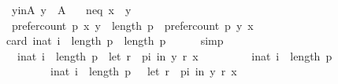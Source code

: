 \begin{isabellebody}
\ \ \ y{\isacharunderscore}{\kern0pt}in{\isacharunderscore}{\kern0pt}A{\isacharcolon}{\kern0pt}\ {\isachardoublequoteopen}y\ {\isasymin}\ A{\isachardoublequoteclose}\isanewline
\ \ \ neq{\isacharcolon}{\kern0pt}\ {\isachardoublequoteopen}x\ {\isasymnoteq}\ y{\isachardoublequoteclose}\isanewline
\ \ \ {\isachardoublequoteopen}prefer{\isacharunderscore}{\kern0pt}count\ p\ x\ y\ {\isacharequal}{\kern0pt}\ {\isacharparenleft}{\kern0pt}length\ p{\isacharparenright}{\kern0pt}\ {\isacharminus}{\kern0pt}\ {\isacharparenleft}{\kern0pt}prefer{\isacharunderscore}{\kern0pt}count\ p\ y\ x{\isacharparenright}{\kern0pt}{\isachardoublequoteclose}\isanewline
%
\isadelimproof
%
\endisadelimproof
%
\isatagproof
{}\isamarkupfalse%
\ {\isacharminus}{\kern0pt}\isanewline
\ \ \isamarkupfalse%
\ {}{}{\isacharcolon}{\kern0pt}\ {\isachardoublequoteopen}card\ {\isacharbraceleft}{\kern0pt}i{\isacharcolon}{\kern0pt}{\isacharcolon}{\kern0pt}nat{\isachardot}{\kern0pt}\ i\ {\isacharless}{\kern0pt}\ length\ p{\isacharbraceright}{\kern0pt}\ {\isacharequal}{\kern0pt}\ length\ p{\isachardoublequoteclose}\isanewline
\ \ \ \ \isamarkupfalse%
\ simp\isanewline
\ \ \isamarkupfalse%
\ {}{}{\isacharcolon}{\kern0pt}\isanewline
\ \ \ \ {\isachardoublequoteopen}{\isacharbraceleft}{\kern0pt}i{\isacharcolon}{\kern0pt}{\isacharcolon}{\kern0pt}nat{\isachardot}{\kern0pt}\ i\ {\isacharless}{\kern0pt}\ length\ p\ {\isasymand}\ {\isacharparenleft}{\kern0pt}let\ r\ {\isacharequal}{\kern0pt}\ {\isacharparenleft}{\kern0pt}p{\isacharbang}{\kern0pt}i{\isacharparenright}{\kern0pt}\ in\ {\isacharparenleft}{\kern0pt}y\ {\isasympreceq}\isactrlsub r\ x{\isacharparenright}{\kern0pt}{\isacharparenright}{\kern0pt}{\isacharbraceright}{\kern0pt}\ {\isacharequal}{\kern0pt}\isanewline
\ \ \ \ \ \ \ \ {\isacharbraceleft}{\kern0pt}i{\isacharcolon}{\kern0pt}{\isacharcolon}{\kern0pt}nat{\isachardot}{\kern0pt}\ i\ {\isacharless}{\kern0pt}\ length\ p{\isacharbraceright}{\kern0pt}\ {\isacharminus}{\kern0pt}\isanewline
\ \ \ \ \ \ \ \ \ \ {\isacharbraceleft}{\kern0pt}i{\isacharcolon}{\kern0pt}{\isacharcolon}{\kern0pt}nat{\isachardot}{\kern0pt}\ i\ {\isacharless}{\kern0pt}\ length\ p\ {\isasymand}\ {\isasymnot}\ {\isacharparenleft}{\kern0pt}let\ r\ {\isacharequal}{\kern0pt}\ {\isacharparenleft}{\kern0pt}p{\isacharbang}{\kern0pt}i{\isacharparenright}{\kern0pt}\ in\ {\isacharparenleft}{\kern0pt}y\ {\isasympreceq}\isactrlsub r\ x{\isacharparenright}{\kern0pt}{\isacharparenright}{\kern0pt}{\isacharbraceright}{\kern0pt}{\isachardoublequoteclose}\isanewline

\end{isabellebody}
